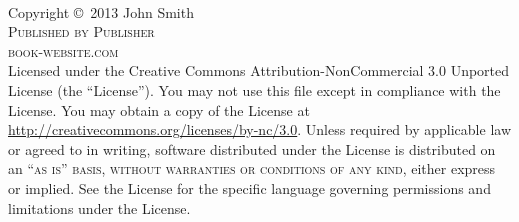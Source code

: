\documentclass[11pt,fleqn]{book} %
\begin{document}

\begingroup
\thispagestyle{empty}
\vfill
\endgroup


\newpage
~\vfill
\thispagestyle{empty}

\noindent Copyright \copyright\ 2013 John Smith\\ %

\noindent \textsc{Published by Publisher}\\ %

\noindent \textsc{book-website.com}\\ %

\noindent Licensed under the Creative Commons Attribution-NonCommercial 3.0 Unported License (the ``License''). You may not use this file except in compliance with the License. You may obtain a copy of the License at \url{http://creativecommons.org/licenses/by-nc/3.0}. Unless required by applicable law or agreed to in writing, software distributed under the License is distributed on an \textsc{``as is'' basis, without warranties or conditions of any kind}, either express or implied. See the License for the specific language governing permissions and limitations under the License.\\ %
\end{document}
